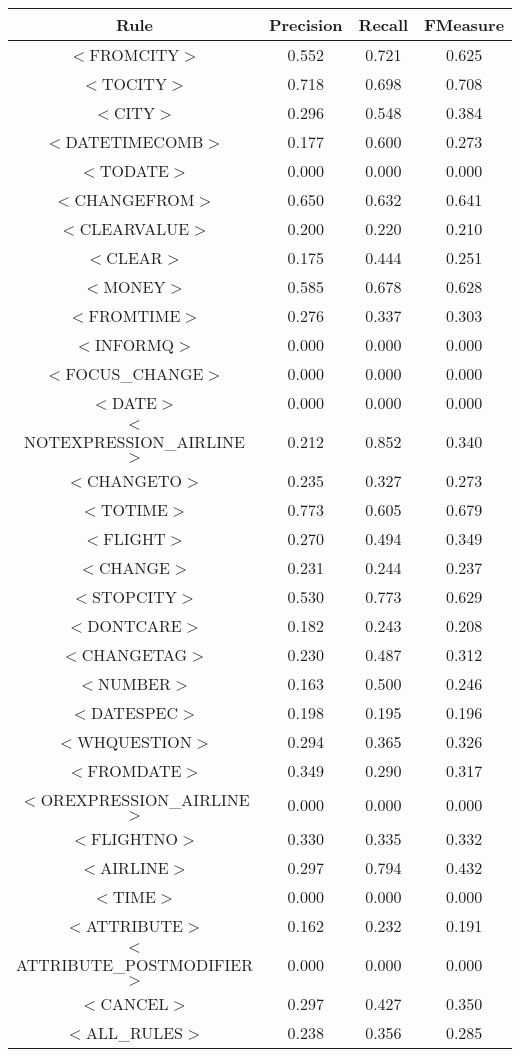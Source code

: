 \documentclass[a4paper,10pt]{article}
\begin{document}
\begin{center}
\begin{tabular}{|c||c|c|c|}
\hline
Rule&Precision&Recall&FMeasure\\
\hline
\hline
$<$FROMCITY$>$&0.552&0.721&0.625 \\
\hline$<$TOCITY$>$&0.718&0.698&0.708 \\
\hline$<$CITY$>$&0.296&0.548&0.384 \\
\hline$<$DATETIMECOMB$>$&0.177&0.600&0.273 \\
\hline$<$TODATE$>$&0.000&0.000&0.000 \\
\hline$<$CHANGEFROM$>$&0.650&0.632&0.641 \\
\hline$<$CLEARVALUE$>$&0.200&0.220&0.210 \\
\hline$<$CLEAR$>$&0.175&0.444&0.251 \\
\hline$<$MONEY$>$&0.585&0.678&0.628 \\
\hline$<$FROMTIME$>$&0.276&0.337&0.303 \\
\hline$<$INFORMQ$>$&0.000&0.000&0.000 \\
\hline$<$FOCUS\_CHANGE$>$&0.000&0.000&0.000 \\
\hline$<$DATE$>$&0.000&0.000&0.000 \\
\hline$<$NOTEXPRESSION\_AIRLINE$>$&0.212&0.852&0.340 \\
\hline$<$CHANGETO$>$&0.235&0.327&0.273 \\
\hline$<$TOTIME$>$&0.773&0.605&0.679 \\
\hline$<$FLIGHT$>$&0.270&0.494&0.349 \\
\hline$<$CHANGE$>$&0.231&0.244&0.237 \\
\hline$<$STOPCITY$>$&0.530&0.773&0.629 \\
\hline$<$DONTCARE$>$&0.182&0.243&0.208 \\
\hline$<$CHANGETAG$>$&0.230&0.487&0.312 \\
\hline$<$NUMBER$>$&0.163&0.500&0.246 \\
\hline$<$DATESPEC$>$&0.198&0.195&0.196 \\
\hline$<$WHQUESTION$>$&0.294&0.365&0.326 \\
\hline$<$FROMDATE$>$&0.349&0.290&0.317 \\
\hline$<$OREXPRESSION\_AIRLINE$>$&0.000&0.000&0.000 \\
\hline$<$FLIGHTNO$>$&0.330&0.335&0.332 \\
\hline$<$AIRLINE$>$&0.297&0.794&0.432 \\
\hline$<$TIME$>$&0.000&0.000&0.000 \\
\hline$<$ATTRIBUTE$>$&0.162&0.232&0.191 \\
\hline$<$ATTRIBUTE\_POSTMODIFIER$>$&0.000&0.000&0.000 \\
\hline$<$CANCEL$>$&0.297&0.427&0.350 \\
\hline
\hline
$<$ALL\_RULES$>$&0.238&0.356&0.285 \\
\hline
\end{tabular}
\end{center}
\end{document}
